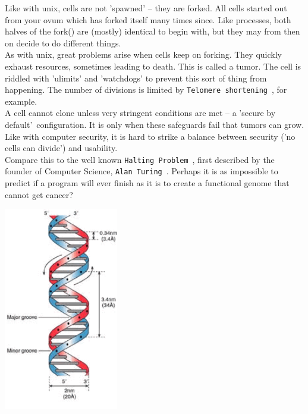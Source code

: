 \documentclass[11pt,twoside,a4paper]{article}
\begin{document}
\begin{minipage}[ht]{13.75cm}
	Like with unix, cells are not 'spawned' -- they are forked. All cells started out from your ovum which has forked itself many times since. Like processes, both halves of the fork() are (mostly) identical to begin with, but they may from then on decide to do different things. ~\\

	As with unix, great problems arise when cells keep on forking. They quickly exhaust resources, sometimes leading to death. This is called a tumor. The cell is riddled with 'ulimits' and 'watchdogs' to prevent this sort of thing from happening. The number of divisions is limited by \texttt{Telomere shortening}~\footnotemark, for example. ~\\

	A cell cannot clone unless very stringent conditions are met -- a 'secure by default'~\footnotemark configuration. It is only when these safeguards fail that tumors can grow. Like with computer security, it is hard to strike a balance between security ('no cells can divide') and usability. ~\\

	Compare this to the well known \texttt{Halting Problem}~\footnotemark, first described by the founder of Computer Science, \texttt{Alan Turing}~\footnotemark. Perhaps it is as impossible to predict if a program will ever finish as it is to create a functional genome that cannot get cancer? %
\end{minipage} \hfill \begin{minipage}[ht]{5.25cm}
	\includegraphics[width=5.0cm]{img/helix.png}
\end{minipage}
\end{document}
